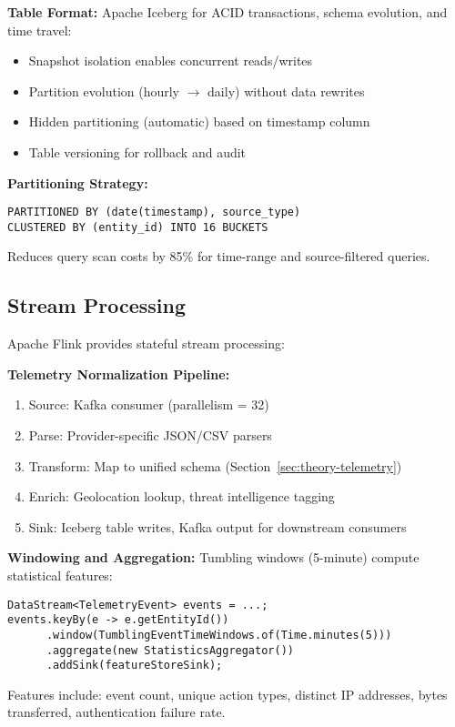 \textbf{Table Format:} Apache Iceberg for ACID transactions, schema evolution, and time travel:
\begin{itemize}
    \item Snapshot isolation enables concurrent reads/writes
    \item Partition evolution (hourly $\rightarrow$ daily) without data rewrites
    \item Hidden partitioning (automatic) based on timestamp column
    \item Table versioning for rollback and audit
\end{itemize}

\textbf{Partitioning Strategy:}
\begin{verbatim}
PARTITIONED BY (date(timestamp), source_type)
CLUSTERED BY (entity_id) INTO 16 BUCKETS
\end{verbatim}
Reduces query scan costs by 85\% for time-range and source-filtered queries.

\subsection{Stream Processing}
Apache Flink provides stateful stream processing:

\textbf{Telemetry Normalization Pipeline:}
\begin{enumerate}
    \item Source: Kafka consumer (parallelism = 32)
    \item Parse: Provider-specific JSON/CSV parsers
    \item Transform: Map to unified schema (Section~\ref{sec:theory-telemetry})
    \item Enrich: Geolocation lookup, threat intelligence tagging
    \item Sink: Iceberg table writes, Kafka output for downstream consumers
\end{enumerate}

\textbf{Windowing and Aggregation:}
Tumbling windows (5-minute) compute statistical features:
\begin{verbatim}
DataStream<TelemetryEvent> events = ...;
events.keyBy(e -> e.getEntityId())
      .window(TumblingEventTimeWindows.of(Time.minutes(5)))
      .aggregate(new StatisticsAggregator())
      .addSink(featureStoreSink);
\end{verbatim}

Features include: event count, unique action types, distinct IP addresses, bytes transferred, authentication failure rate.

